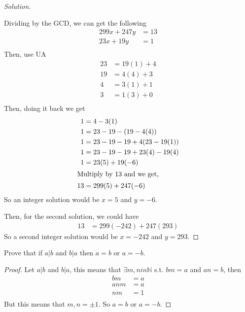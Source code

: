 \documentclass[11pt]{article}
\newcommand{\N}{\mathbb{N}}
\newenvironment{problem}[2][Problem]{\begin{trivlist}
\item[\hskip \labelsep {\bfseries #1}\hskip \labelsep {\bfseries #2.}]}{\end{trivlist}}
\newenvironment{solution}
  {\renewcommand\qedsymbol{$~$}\begin{proof}[Solution]$ $\par\nobreak\ignorespaces}
  {\end{proof}}
\begin{document}
\begin{solution}
  Dividing by the GCD, we can get the following
  \begin{align*}
    299x+ 247y & = 13 \\
    23x + 19y  & = 1  \\
  \end{align*}
  Then, use UA
  \begin{align*}
    23 & = 19(1)+ 4 \\
    19 & = 4(4) + 3 \\
    4  & = 3(1) + 1 \\
    3  & = 1(3) + 0 \\
  \end{align*}
  Then, doing it back we get
  \begin{align*}
    1  & = 4 - 3(1)                   \\
    1  & = 23-19 - (19-4(4))          \\
    1  & = 23-19 - 19+4(23-19(1))     \\
    1  & = 23-19 - 19 + 23(4) - 19(4) \\
    1  & = 23(5) +19(-6)              \\
    \intertext{Multiply by 13 and we get,}
    13 & = 299(5) + 247(-6)           \\
  \end{align*}
  So an integer solution would be $x=5$ and $y=-6$.

  Then, for the second solution, we could have
  \begin{align*}
    13 & = 299(-242) + 247(293)
  \end{align*}
  So a second integer solution would be $x=-242$ and $y=293$.
\end{solution}



\begin{problem}{7}
Prove that if $a|b$ and $b|a$ then $a=b$ or $a=-b$.
\end{problem}

\begin{proof}
  Let $a|b$ and $b|a$, this means that $\exists m,n in \N$ s.t. $bm=a$ and $an=b$, then
  \begin{align*}
    bm  & = a \\
    anm & = a \\
    nm  & = 1 \\
  \end{align*}
  But this means that $m,n=\pm 1$. So $a=b$ or $a=-b$.
\end{proof}
\end{document}
